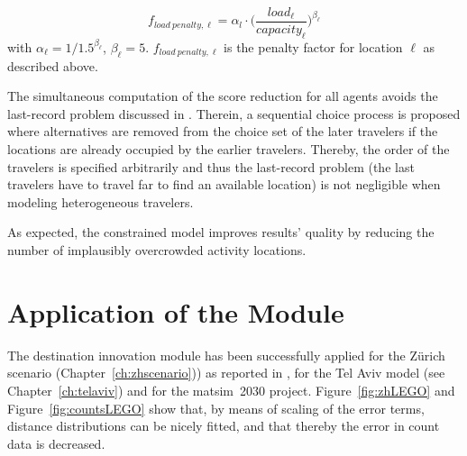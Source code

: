 \[
f_{load\ penalty, \ell}=\alpha_l \cdot \Bigg(\frac{load_{\ell}}{capacity_{\ell}}\Bigg)^{\beta_\ell}
\]
with $\alpha_\ell=1/1.5^{\beta_\ell}$, $\beta_\ell=5$. $f_{load\ penalty, \ell}$ is the penalty factor for location $\ell$ as described above.

The simultaneous computation of the score reduction for all agents avoids the last-record problem discussed in \citet[][]{VovshaEtAl_TRR_2002}. 
Therein, a sequential choice process is proposed where alternatives are removed from the choice set of the later travelers if the locations are already occupied by the earlier travelers. 
Thereby, the order of the travelers is specified arbitrarily and thus the last-record problem (the last travelers have to travel far to find an available location) is not negligible when modeling heterogeneous travelers. 

As expected, the constrained model improves results' quality by reducing the number of implausibly overcrowded activity locations.

\section{Application of the Module}
The destination innovation module has been successfully applied for the Zürich scenario (Chapter~\ref{ch:zhscenario})) as reported in \citet[][p.99]{Horni_PhDThesis_2013}, for the Tel Aviv model (see Chapter~\ref{ch:telaviv}) and for the \gls{matsim}~2030 project. 
Figure~\ref{fig:zhLEGO} and Figure~\ref{fig:countsLEGO} show that, by means of scaling of the error terms, distance distributions can be nicely fitted, and that thereby the error in count data is decreased.

